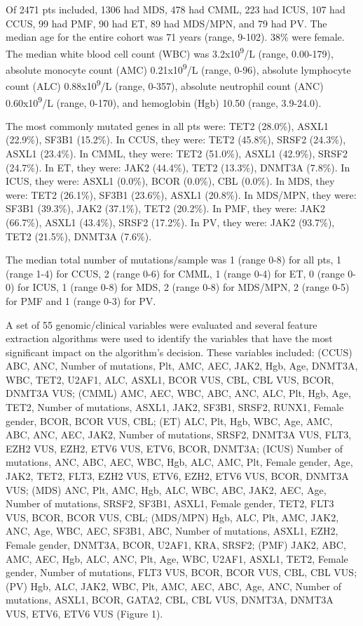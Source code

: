 Of 2471 pts included, 1306 had MDS, 478 had CMML, 223 had ICUS, 107 had CCUS, 99 had PMF, 90 had ET, 89 had MDS/MPN, and 79 had PV. The median age for the entire cohort was 71 years (range, 9-102). 38\% were female. The median white blood cell count (WBC) was 3.2x10\textsuperscript{9}/L (range, 0.00-179), absolute monocyte count (AMC) 0.21x10\textsuperscript{9}/L (range, 0-96), absolute lymphocyte count (ALC) 0.88x10\textsuperscript{9}/L (range, 0-357), absolute neutrophil count (ANC) 0.60x10\textsuperscript{9}/L (range, 0-170), and hemoglobin (Hgb) 10.50 (range, 3.9-24.0). 

The most commonly mutated genes in all pts were: TET2 (28.0\%), ASXL1 (22.9\%), SF3B1 (15.2\%). In CCUS, they were: TET2 (45.8\%), SRSF2 (24.3\%), ASXL1 (23.4\%). In CMML, they were: TET2 (51.0\%), ASXL1 (42.9\%), SRSF2 (24.7\%). In ET, they were: JAK2 (44.4\%), TET2 (13.3\%), DNMT3A (7.8\%). In ICUS, they were: ASXL1 (0.0\%), BCOR (0.0\%), CBL (0.0\%). In MDS, they were: TET2 (26.1\%), SF3B1 (23.6\%), ASXL1 (20.8\%). In MDS/MPN, they were: SF3B1 (39.3\%), JAK2 (37.1\%), TET2 (20.2\%). In PMF, they were: JAK2 (66.7\%), ASXL1 (43.4\%), SRSF2 (17.2\%). In PV, they were: JAK2 (93.7\%), TET2 (21.5\%), DNMT3A (7.6\%).

The median total number of mutations/sample was 1 (range 0-8) for all pts, 1 (range 1-4) for CCUS, 2 (range 0-6) for CMML, 1 (range 0-4) for ET, 0 (range 0-0) for ICUS, 1 (range 0-8) for MDS, 2 (range 0-8) for MDS/MPN, 2 (range 0-5) for PMF and 1 (range 0-3) for PV.


A set of 55 genomic/clinical variables were evaluated and several feature extraction algorithms were used to identify the variables that have the most significant impact on the algorithm's decision. These variables included: (CCUS) ABC, ANC, Number of mutations, Plt, AMC, AEC, JAK2, Hgb, Age, DNMT3A, WBC, TET2, U2AF1, ALC, ASXL1, BCOR VUS, CBL, CBL VUS, BCOR, DNMT3A VUS; (CMML) AMC, AEC, WBC, ABC, ANC, ALC, Plt, Hgb, Age, TET2, Number of mutations, ASXL1, JAK2, SF3B1, SRSF2, RUNX1, Female gender, BCOR, BCOR VUS, CBL; (ET) ALC, Plt, Hgb, WBC, Age, AMC, ABC, ANC, AEC, JAK2, Number of mutations, SRSF2, DNMT3A VUS, FLT3, EZH2 VUS, EZH2, ETV6 VUS, ETV6, BCOR, DNMT3A; (ICUS) Number of mutations, ANC, ABC, AEC, WBC, Hgb, ALC, AMC, Plt, Female gender, Age, JAK2, TET2, FLT3, EZH2 VUS, ETV6, EZH2, ETV6 VUS, BCOR, DNMT3A VUS; (MDS) ANC, Plt, AMC, Hgb, ALC, WBC, ABC, JAK2, AEC, Age, Number of mutations, SRSF2, SF3B1, ASXL1, Female gender, TET2, FLT3 VUS, BCOR, BCOR VUS, CBL; (MDS/MPN) Hgb, ALC, Plt, AMC, JAK2, ANC, Age, WBC, AEC, SF3B1, ABC, Number of mutations, ASXL1, EZH2, Female gender, DNMT3A, BCOR, U2AF1, KRA, SRSF2; (PMF) JAK2, ABC, AMC, AEC, Hgb, ALC, ANC, Plt, Age, WBC, U2AF1, ASXL1, TET2, Female gender, Number of mutations, FLT3 VUS, BCOR, BCOR VUS, CBL, CBL VUS; (PV) Hgb, ALC, JAK2, WBC, Plt, AMC, AEC, ABC, Age, ANC, Number of mutations, ASXL1, BCOR, GATA2, CBL, CBL VUS, DNMT3A, DNMT3A VUS, ETV6, ETV6 VUS (Figure 1).

